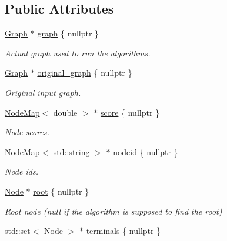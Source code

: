 \subsection*{Public Attributes}
\begin{DoxyCompactItemize}
\item 
\hyperlink{namespacederegnet_a55b76c55bbabc682cbc61f8b9948799e}{Graph} $\ast$ \hyperlink{classderegnet_1_1DeregnetData_ab76d30fa2ef87099faecb31e3f95b6d6}{graph} \{ nullptr \}
\begin{DoxyCompactList}\small\item\em Actual graph used to run the algorithms. \end{DoxyCompactList}\item 
\hyperlink{namespacederegnet_a55b76c55bbabc682cbc61f8b9948799e}{Graph} $\ast$ \hyperlink{classderegnet_1_1DeregnetData_a3ea2abe9900785d80fa0141afdd985a9}{original\+\_\+graph} \{ nullptr \}
\begin{DoxyCompactList}\small\item\em Original input graph. \end{DoxyCompactList}\item 
\hyperlink{namespacederegnet_ae102b707ae1d6f83c639ece5e0dd5658}{Node\+Map}$<$ double $>$ $\ast$ \hyperlink{classderegnet_1_1DeregnetData_a32970c8f43eb8be313ad08d829223b1f}{score} \{ nullptr \}
\begin{DoxyCompactList}\small\item\em Node scores. \end{DoxyCompactList}\item 
\hyperlink{namespacederegnet_ae102b707ae1d6f83c639ece5e0dd5658}{Node\+Map}$<$ std\+::string $>$ $\ast$ \hyperlink{classderegnet_1_1DeregnetData_a3b57d7ed19c104c7fe257e17f0d2cfb5}{nodeid} \{ nullptr \}
\begin{DoxyCompactList}\small\item\em Node id\textquotesingle{}s. \end{DoxyCompactList}\item 
\hyperlink{namespacederegnet_a744bad34f2de9856d36715a445f027f3}{Node} $\ast$ \hyperlink{classderegnet_1_1DeregnetData_a51a22fd88f929b1b1a00edb409b4cd55}{root} \{ nullptr \}
\begin{DoxyCompactList}\small\item\em Root node (null if the algorithm is supposed to find the root) \end{DoxyCompactList}\item 
std\+::set$<$ \hyperlink{namespacederegnet_a744bad34f2de9856d36715a445f027f3}{Node} $>$ $\ast$ \hyperlink{classderegnet_1_1DeregnetData_a1fe559c6056cd411647f836849e4b0da}{terminals} \{ nullptr \}

\end{DoxyCompactItemize}
